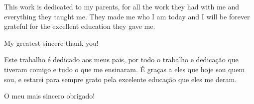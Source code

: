 


\frontmatter %

\pagestyle{plain} %


\maketitlepage

%
\begin{dedicatory}
This work is dedicated to my parents, for all the work they had with me and everything they taught me. They made me who I am today and I will be forever grateful for the excellent education they gave me.

My greatest sincere thank you!

\end{dedicatory}

\begin{dedicatoryotherlanguage}
Este trabalho é dedicado aos meus pais, por todo o trabalho e dedicação que tiveram comigo e tudo o que me ensinaram. É graças a eles que hoje sou quem sou, e estarei para sempre grato pela excelente educação que eles me deram.

O meu mais sincero obrigado!
\end{dedicatoryotherlanguage}




